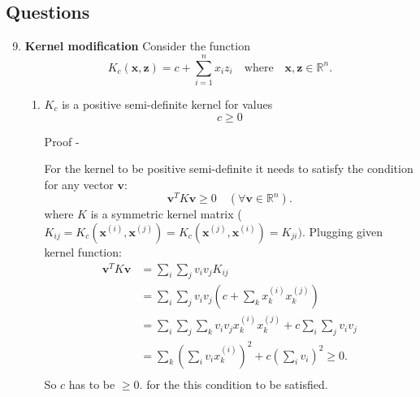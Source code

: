 \documentclass{article}
\begin{document}
\subsection{Questions}
\begin{enumerate}
  \setcounter{enumi}{8 }
  \item \textbf{Kernel modification} Consider the function \
    \[
    K_c(\mathbf{x}, \mathbf{z}) = c + \sum_{i=1}^n x_i z_i \quad \text{where} \quad \mathbf{x}, \mathbf{z} \in \mathbb{R}^n.
    \]
    \begin{enumerate}
        \item
            \( K_c \) is a positive semi-definite kernel for values
                \[{c}\geq{0}\]

            Proof -

            For the kernel to be positive semi-definite it needs to satisfy the condition for any vector $\mathbf{v}$:
            \[\mathbf{v}^T K \mathbf{v} \geq 0 \quad (\forall \mathbf{v} \in \mathbb{R}^n).\]
            where \( K \) is a symmetric kernel matrix (${K_{ij}} = K_c(\mathbf{x}^{(i)}, \mathbf{x}^{(j)}) = K_c(\mathbf{x}^{(j)}, \mathbf{x}^{(i)}) = K_{ji})$. Plugging given kernel function:
            \begin{align*}
            \mathbf{v}^T K \mathbf{v} &= \sum_{i} \sum_{j} v_i v_j K_{ij} \\
            &= \sum_{i} \sum_{j}  v_i v_j (c + \sum_{k}x^{(i)}_k x^{(j)}_k)  \\
            &= \sum_{i} \sum_{j} \sum_{k} v_i v_j x^{(i)}_k x^{(j)}_k + c\sum_{i} \sum_{j}  v_i v_j \\
            &= \sum_{k} \left( \sum_{i} v_i x^{(i)}_k \right)^2 + c\left(\sum_{i} v_i\right)^2
            \geq 0.
            \\
            \end{align*}
            So $c$ has to be $\geq 0.$ for the this condition to be satisfied.


\end{enumerate}
\end{enumerate}
\end{document}
